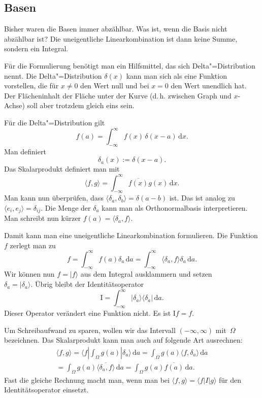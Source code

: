 \documentclass[a4paper,10pt,fleqn,twocolumn,twoside]{article}
\numberwithin{equation}{section}
\begin{document}
\subsection{Basen}

Bisher waren die Basen immer abzählbar. Was ist, wenn die Basis nicht
abzählbar ist? Die uneigentliche Linearkombination ist dann keine
Summe, sondern ein Integral.

Für die Formulierung benötigt man ein Hilfsmittel, das sich
Delta"=Distribution nennt. Die Delta"=Distribution $\delta(x)$ kann man
sich als eine Funktion vorstellen, die für $x\ne 0$ den Wert null
und bei $x=0$ den Wert unendlich hat. Der Flächeninhalt der Fläche
unter der Kurve (d.\,h. zwischen Graph und $x$-Achse) soll aber
trotzdem gleich eins sein.

Für die Delta"=Distribution gilt
\begin{equation}
f(a) = \int_{-\infty}^{\infty} f(x)\,\delta(x-a)\,\mathrm dx.
\end{equation}
Man definiert
\begin{equation}
\delta_a(x) := \delta(x-a).
\end{equation}
Das Skalarprodukt definiert man mit
\begin{equation}
\langle f,g\rangle
= \int_{-\infty}^{\infty} \overline{f(x)}g(x)\,\mathrm dx.
\end{equation}
Man kann nun überprüfen, dass
$\langle\delta_a,\delta_b\rangle=\delta(a-b)$ ist. Das ist analog
zu $\langle e_i,e_j\rangle = \delta_{ij}$. Die Menge der
$\delta_a$ kann man als Orthonormalbasis interpretieren.
Man schreibt nun kürzer $f(a) = \langle\delta_a,f\rangle$.

Damit kann man eine uneigentliche Linearkombination formulieren.
Die Funktion $f$ zerlegt man zu
\begin{equation}
f = \int_{-\infty}^{\infty} f(a)\delta_a\,\mathrm da
= \int_{-\infty}^{\infty} \langle\delta_a,f\rangle\delta_a\,\mathrm da.
\end{equation}
Wir können nun $f=|f\rangle$ aus dem Integral ausklammern und setzen\\
$\delta_a = |\delta_a\rangle$.
Übrig bleibt der Identitätsoperator
\begin{equation}
\mathrm I
= \int_{-\infty}^{\infty} |\delta_a\rangle\langle\delta_a|\,\mathrm da.
\end{equation}
Dieser Operator verändert eine Funktion nicht. Es ist $\mathrm If=f$.

Um Schreibaufwand zu sparen, wollen wir das Intervall
$(-\infty,\infty)$ mit~$\Omega$ bezeichnen. Das Skalarprodukt
kann man auch auf folgende Art ausrechnen:
\begin{gather*}
\langle f,g\rangle = \langle f|\int_{\Omega} g(a)|\delta_a\rangle\,\mathrm da
= \int_{\Omega} g(a)\langle f,\delta_a\rangle\,\mathrm da\\
= \int_{\Omega} g(a)\overline{\langle\delta_a,f\rangle}\,\mathrm da
= \int_{\Omega} g(a)\overline{f(a)}\,\mathrm da.
\end{gather*}
Fast die gleiche Rechnung macht man, wenn man bei
$\langle f,g\rangle=\langle f|I|g\rangle$ für den
Identitätsoperator einsetzt.
\end{document}
